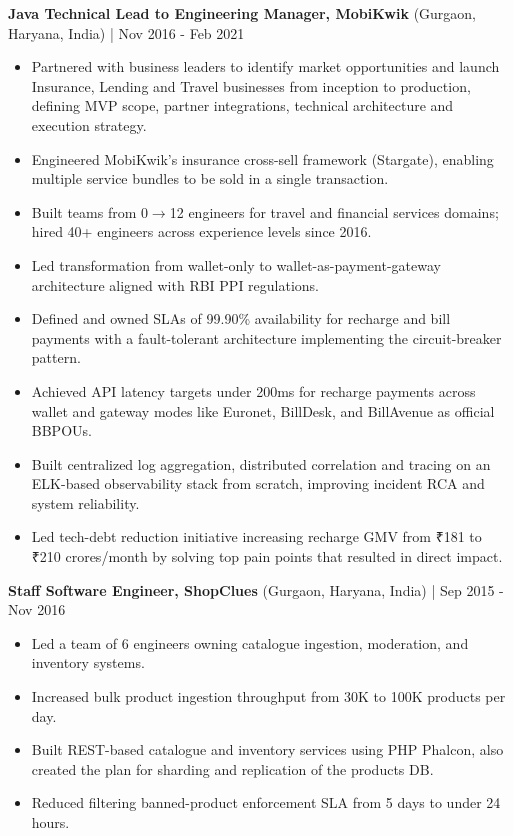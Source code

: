 \documentclass[11pt,a4paper]{article}
\begin{document}
\vspace{4pt}

\textbf{Java Technical Lead to Engineering Manager, MobiKwik} (Gurgaon, Haryana, India) | Nov 2016 - Feb 2021 \\
\begin{itemize}[leftmargin=*]
    \item Partnered with business leaders to identify market opportunities and launch Insurance, Lending and Travel businesses from inception to production, defining MVP scope, partner integrations, technical architecture and execution strategy.
    \item Engineered MobiKwik's insurance cross-sell framework (Stargate), enabling multiple service bundles to be sold in a single transaction.
    \item Built teams from 0$\to$12 engineers for travel and financial services domains; hired 40+ engineers across experience levels since 2016.
    \item Led transformation from wallet-only to wallet-as-payment-gateway architecture aligned with RBI PPI regulations.
    \item Defined and owned SLAs of 99.90\% availability for recharge and bill payments with a fault-tolerant architecture implementing the circuit-breaker pattern.
    \item Achieved API latency targets under 200ms for recharge payments across wallet and gateway modes like Euronet, BillDesk, and BillAvenue as official BBPOUs.
    \item Built centralized log aggregation, distributed correlation and tracing on an ELK-based observability stack from scratch, improving incident RCA and system reliability.
    \item Led tech-debt reduction initiative increasing recharge GMV from ₹181 to ₹210 crores/month by solving top pain points that resulted in direct impact.
\end{itemize}

\vspace{4pt}

\textbf{Staff Software Engineer, ShopClues} (Gurgaon, Haryana, India) | Sep 2015 - Nov 2016 \\
\begin{itemize}[leftmargin=*]
    \item Led a team of 6 engineers owning catalogue ingestion, moderation, and inventory systems.
    \item Increased bulk product ingestion throughput from 30K to 100K products per day.
    \item Built REST-based catalogue and inventory services using PHP Phalcon, also created the plan for sharding and replication of the products DB.
    \item Reduced filtering banned-product enforcement SLA from 5 days to under 24 hours.
\end{itemize}
\end{document}
